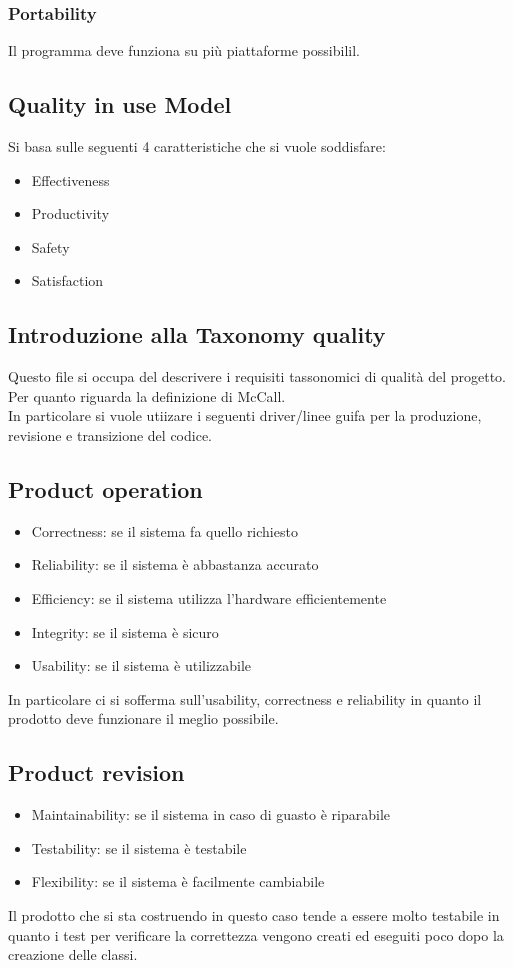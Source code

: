 \documentclass{article}
\begin{document}
\subsubsection{Portability}
Il programma deve funziona su più piattaforme possibilil.

\subsection{Quality in use Model}
Si basa sulle seguenti 4 caratteristiche che si vuole soddisfare:
\begin{itemize}
    \item Effectiveness
    \item Productivity
    \item Safety
    \item Satisfaction 
\end{itemize}

\subsection{Introduzione alla Taxonomy quality}
Questo file si occupa del descrivere i requisiti tassonomici di qualità del progetto.
\\Per quanto riguarda la definizione di McCall.
\\In particolare si vuole utiizare i seguenti driver/linee guifa per la produzione, revisione e
transizione  del codice.     
\subsection{Product operation}
\begin{itemize}
    \item Correctness: se il sistema fa quello richiesto
    \item Reliability: se il sistema è abbastanza accurato
    \item Efficiency: se il sistema utilizza l'hardware efficientemente
    \item Integrity: se il sistema è sicuro
    \item Usability: se il sistema è utilizzabile
\end{itemize}
In particolare ci si sofferma sull'usability, correctness e reliability in quanto il 
prodotto deve funzionare il meglio possibile.

\subsection{Product revision}
\begin{itemize}
    \item Maintainability: se il sistema in caso di guasto è riparabile
    \item Testability: se il sistema è testabile 
    \item Flexibility: se il sistema è facilmente cambiabile
\end{itemize}
Il prodotto che si sta costruendo in questo caso tende a essere molto testabile in 
quanto i test per verificare la correttezza vengono creati ed eseguiti poco dopo la  creazione
delle classi.
\end{document}
